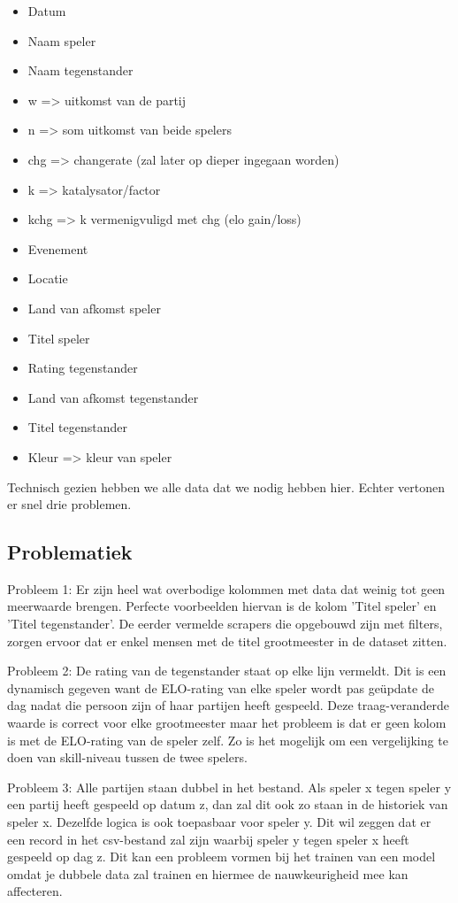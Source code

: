 \begin{itemize}
    \item Datum
    \item Naam speler
    \item Naam tegenstander
    \item w => uitkomst van de partij
    \item n => som uitkomst van beide spelers
    \item chg => changerate (zal later op dieper ingegaan worden)
    \item k => katalysator/factor
    \item kchg => k vermenigvuligd met chg (elo gain/loss)
    \item Evenement
    \item Locatie
    \item Land van afkomst speler
    \item Titel speler
    \item Rating tegenstander
    \item Land van afkomst tegenstander 
    \item Titel tegenstander
    \item Kleur => kleur van speler
\end{itemize}

Technisch gezien hebben we alle data dat we nodig hebben hier. Echter vertonen er snel drie problemen.

\subsection{Problematiek}

Probleem 1: Er zijn heel wat overbodige kolommen met data dat weinig tot geen meerwaarde brengen. Perfecte voorbeelden hiervan is de kolom 'Titel speler' en 'Titel tegenstander'. De eerder vermelde scrapers die opgebouwd zijn met filters, zorgen ervoor dat er enkel mensen met de titel grootmeester in de dataset zitten. 

Probleem 2: De rating van de tegenstander staat op elke lijn vermeldt. Dit is een dynamisch gegeven want de ELO-rating van elke speler wordt pas geüpdate de dag nadat die persoon zijn of haar partijen heeft gespeeld. Deze traag-veranderde waarde is correct voor elke grootmeester maar het probleem is dat er geen kolom is met de ELO-rating van de speler zelf. Zo is het mogelijk om een vergelijking te doen van skill-niveau tussen de twee spelers.

Probleem 3: Alle partijen staan dubbel in het bestand. Als speler x tegen speler y een partij heeft gespeeld op datum z, dan zal dit ook zo staan in de historiek van speler x. Dezelfde logica is ook toepasbaar voor speler y. Dit wil zeggen dat er een record in het csv-bestand zal zijn waarbij speler y tegen speler x heeft gespeeld op dag z. Dit kan een probleem vormen bij het trainen van een model omdat je dubbele data zal trainen en hiermee de nauwkeurigheid mee kan affecteren. 

